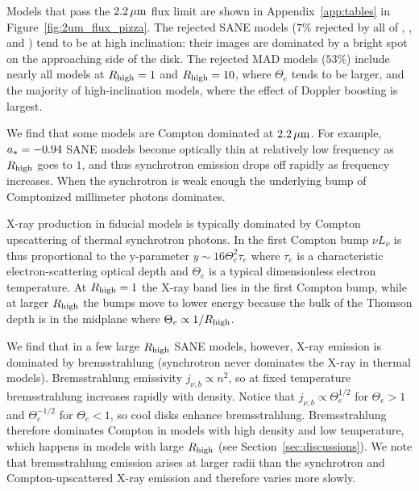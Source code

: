Models that pass the $2.2\,\mu\mathrm{m}$ flux limit are shown in Appendix~\ref{app:tables} in Figure~\ref{fig:2um_flux_pizza}.
The rejected SANE models ($7\%$ rejected by all of \kharma, \bhac, and \hamr) tend to be at high inclination: their images are dominated by a bright spot on the approaching side of the disk.
The rejected MAD models ($53\%$) include nearly all models at $R_\mathrm{high} = 1$ and $R_\mathrm{high} = 10$, where $\Theta_e$ tends to be larger, and the majority of high-inclination models, where the effect of Doppler boosting is largest.

We find that some models are Compton dominated at $2.2\,\mu\mathrm{m}$.
For example, $a_* = -0.94$ SANE models become optically thin at relatively low frequency as $R_\mathrm{high}$ goes to $1$, and thus synchrotron emission drops off rapidly as frequency increases.  When the synchrotron is weak enough the underlying bump of Comptonized millimeter photons dominates.


X-ray production in fiducial models is typically dominated by Compton upscattering of thermal synchrotron photons.
In the first Compton bump $\nu L_\nu$ is thus proportional to the y-parameter $y \sim 16 \Theta_e^2 \tau_e$ where $\tau_e$ is a characteristic electron-scattering optical depth and $\Theta_e$ is a typical dimensionless electron temperature.
At $R_\mathrm{high} = 1$ the X-ray band lies in the first Compton bump, while at larger $R_\mathrm{high}$ the bumps move to lower energy because the bulk of the Thomson depth is in the midplane where $\Theta_e \propto 1/R_\mathrm{high}$.

We find that in a few large $R_\mathrm{high}$ SANE models, however, X-ray emission is dominated by bremsstrahlung (synchrotron never dominates the X-ray in thermal models).  Bremsstrahlung emissivity $j_{\nu,b} \propto n^2$, so at fixed temperature bremsstrahlung increases rapidly with density. Notice that $j_{\nu,b} \propto \Theta_e^{1/2}$ for $\Theta_e > 1$ and $\Theta_e^{-1/2}$ for $\Theta_e < 1$, so cool disks enhance bremsstrahlung.  Bremsstrahlung therefore dominates Compton in models with high density and low temperature, which happens in models with large $R_\mathrm{high}$ (see Section~\ref{sec:discussions}).  We note that bremsstrahlung emission arises at larger radii than the synchrotron and Compton-upscattered X-ray emission and therefore varies more slowly.

